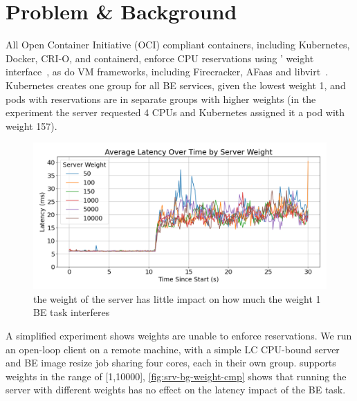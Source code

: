 
\section{Problem \& Background}

All Open Container Initiative (OCI) compliant containers, including Kubernetes,
Docker, CRI-O, and containerd, enforce CPU reservations using \cgroups{}' weight
interface~\cite{oci-cgroups, docker-docs-cgroups, container-isolation-article},
as do VM frameworks, including Firecracker, AFaas and
libvirt~\cite{firecracker-cgroups,afaas,libvirt-cgroups}. Kubernetes creates one
group for all BE services, given the lowest weight 1, and pods with reservations
are in separate groups with higher weights (in the experiment the server
requested 4 CPUs and Kubernetes assigned it a pod with weight 157).\

\begin{figure}[t]
    \centering
    \includegraphics[width=\columnwidth]{graphs/srv-bg-weight-cmp-low.png}
    \caption{ the weight of the server has little impact on how much the
    weight 1 BE task interferes }\label{fig:srv-bg-weight-cmp}
\end{figure}


A simplified experiment shows \cgroups{} weights are unable to enforce
reservations. We run an open-loop client on a remote machine, with a simple LC
CPU-bound server and BE image resize job sharing four cores, each in their own
group. \cgroups{} supports weights in the range of [1,10000],
\autoref{fig:srv-bg-weight-cmp} shows that running the server with different
weights has no effect on the latency impact of the BE task.


